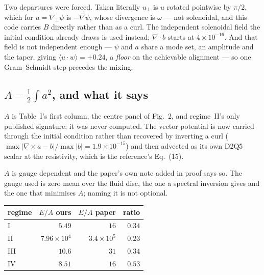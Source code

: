 \documentclass[11pt,a4paper]{article}
\begin{document}
Two departures were forced. Taken literally $u_\perp$ is $u$ rotated pointwise by
$\pi/2$, which for $u=\nabla_\perp\psi$ is $-\nabla\psi$, whose divergence is
$\omega$ --- not solenoidal, and this code carries $B$ directly rather than as a
curl. The independent solenoidal field the initial condition already draws is
used instead; $\nabla\cdot b$ starts at $4\times10^{-16}$. And that field is not
independent enough --- $\psi$ and $a$ share a mode set, an amplitude and the
taper, giving $\langle u\cdot w\rangle=+0.24$, a \emph{floor} on the achievable
alignment --- so one Gram--Schmidt step precedes the mixing.

\subsection{$A=\tfrac12\int a^2$, and what it says}

$A$ is Table~I's first column, the centre panel of Fig.~2, and regime~II's only
published signature; it was never computed. The vector potential is now carried
through the initial condition rather than recovered by inverting a curl
($\max|\nabla\times a - b|/\max|b| = 1.9\times10^{-15}$) and then advected as its
own D2Q5 scalar at the resistivity, which is the reference's Eq.~(15).

$A$ is gauge dependent and the paper's own note added in proof says so. The gauge
used is zero mean over the fluid disc, the one a spectral inversion gives and the
one that minimises $A$; naming it is not optional.

\begin{center}
\begin{tabular}{lrrr}
\toprule
regime & $E/A$ ours & $E/A$ paper & ratio \\
\midrule
I   & $5.49$            & $16$              & $0.34$ \\
II  & $7.96\times10^4$  & $3.4\times10^5$   & $0.23$ \\
III & $10.6$            & $31$              & $0.34$ \\
IV  & $8.51$            & $16$              & $0.53$ \\
\bottomrule
\end{tabular}
\end{center}
\end{document}

